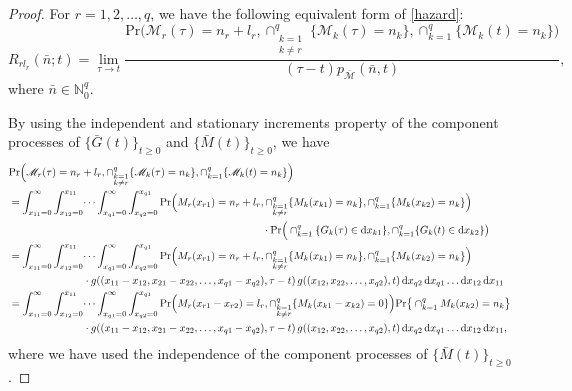 \documentclass[12pt,oneside,reqno]{amsart}
\numberwithin{equation}{section}
\theoremstyle{definition}
\numberwithin{equation}{section}
\theoremstyle{remarkstyle}
\def\k{\kappa}
\begin{document}
\begin{proof}
	For $r=1,2,\dots,q$, we have the following equivalent form of \eqref{hazard}:
	{\footnotesize	\begin{equation}\label{lim}
			R_{rl_r}(\bar{n};t)=\lim_{\tau\to t}\frac{\mathrm{Pr}\Big(\mathscr{M}_r(\tau)=n_r +l_r,\cap_{\substack{k=1\\ k\neq r}}^q\{\mathscr{M}_k(\tau)=n_k\},\cap_{k=1}^{q}\{\mathscr{M}_k(t)=n_k \} \Big)}{(\tau-t)p_{\bar{\mathscr{M}}}(\bar{n},t)},
	\end{equation}}
	where $\bar{n}\in \mathbb{N}_0^q$.
	
	By using the independent and stationary increments property of the component processes of $\{\bar{G}(t)\}_{t\geq0}$ and $\{\bar{M}(t)\}_{t\geq0}$, we have
{\scriptsize	\begin{align}
		&\mathrm{Pr}\Big(\mathscr{M}_r(\tau)=n_r +l_r,\cap_{\substack{k=1\\ k\neq r}}^q\{\mathscr{M}_k(\tau)=n_k\},\cap_{k=1}^{q}\{\mathscr{M}_k(t)=n_k \} \Big)\nonumber\\
		&=\int_{x_{11}=0}^{\infty}\int_{x_{12}=0}^{x_{11}}\dots \int_{x_{q1}=0}^{\infty}\int_{x_{q2}=0}^{x_{q1}}\mathrm{Pr}\Big(M_r(x_{r1})=n_r+l_r,\cap_{\substack{k=1\\k\neq r}}^q\{M_k(x_{k1})=n_k\},\cap_{k=1}^{q}\{M_k(x_{k2})=n_k\}\Big)\nonumber\\
		&\hspace{8.5cm}\cdot\mathrm{Pr}\Big(\cap_{k=1}^{q}\{G_k(\tau)\in\mathrm{d}x_{k1}\},\cap_{k=1}^{q}\{G_k(t)\in\mathrm{d}x_{k2}\}\big)\nonumber\\
		&=\int_{x_{11}=0}^{\infty}\int_{x_{12}=0}^{x_{11}}\dots \int_{x_{q1}=0}^{\infty}\int_{x_{q2}=0}^{x_{q1}}\mathrm{Pr}\Big(M_r(x_{r1})=n_r+l_r,\cap_{\substack{k=1\\k\neq r}}^q\{M_k(x_{k1})=n_k\},\cap_{k=1}^{q}\{M_k(x_{k2})=n_k\}\Big)\nonumber\\
		&\hspace{2.5cm}\cdot g((x_{11}-x_{12},x_{21}-x_{22},\dots,x_{q1}-x_{q2}), \tau-t)\, g((x_{12},x_{22},\dots,x_{q2}), t)\,\mathrm{d}x_{q2}\,\mathrm{d}x_{q1}\dots\mathrm{d}x_{12}\,\mathrm{d}x_{11}\nonumber\\
		&=\int_{x_{11}=0}^{\infty}\int_{x_{12}=0}^{x_{11}}\dots \int_{x_{q1}=0}^{\infty}\int_{x_{q2}=0}^{x_{q1}}\mathrm{Pr}\Big(M_r(x_{r1}-x_{r2})=l_r,\cap_{\substack{k=1\\ k\neq r}}^q\{M_k(x_{k1}-x_{k2})=0\}\Big)\mathrm{Pr}\big\{\cap_{k=1}^{q}M_k(x_{k2})=n_k\big\}\nonumber\\
		&\hspace{2.5cm}\cdot g((x_{11}-x_{12},x_{21}-x_{22},\dots,x_{q1}-x_{q2}), \tau-t)\, g((x_{12},x_{22},\dots,x_{q2}), t)\,\mathrm{d}x_{q2}\,\mathrm{d}x_{q1}\dots\mathrm{d}x_{12}\,\mathrm{d}x_{11},\nonumber
	\end{align}}
	where we have used the independence of the component processes of $\{\bar{M}(t)\}_{t\geq0}$.
	

\end{proof}
\end{document}
